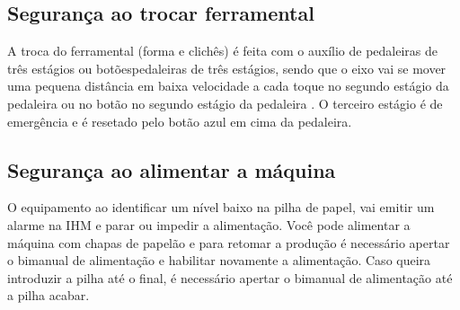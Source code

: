 \ifmachineTypeFlexo
  \newpage
  \thispagestyle{fancy}
  \vspace*{40 pt}
\fi

\subsection{Segurança ao trocar ferramental}

A troca do ferramental (forma e clichês) é feita com o auxílio de \ifmachineTypeFlexo pedaleiras de três estágios ou botões\fi \ifmachineTypeIcv pedaleiras de três estágios\fi, sendo que o 
eixo vai se mover uma pequena distância em baixa velocidade a cada toque \ifmachineTypeFlexo no segundo estágio da pedaleira ou no botão \fi \ifmachineTypeIcv no segundo estágio da pedaleira \fi. 
O terceiro estágio é de emergência e é resetado pelo botão azul em cima da pedaleira.


\subsection{Segurança ao alimentar a máquina}

O equipamento ao identificar um nível baixo na pilha de papel, vai emitir um alarme na IHM e parar ou impedir a alimentação. Você pode alimentar a máquina com chapas de papelão
e para retomar a produção é necessário apertar o bimanual de alimentação e habilitar novamente a alimentação. Caso queira introduzir a pilha até o final, é necessário
apertar o bimanual de alimentação até a pilha acabar.

